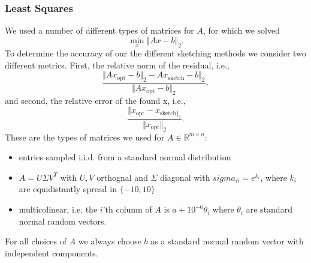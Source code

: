\documentclass{article}
\begin{document}
\subsubsection{Least Squares}
We used a number of different types of matrices for $A$, for which we solved 
$$
\min_x \Vert Ax - b \Vert_2.
$$
To determine the accuracy of our the different sketching methods we consider two different metrics. First, the relative norm of the residual, i.e.,
$$
\frac{\Vert Ax_{\mathrm{opt}} - b \Vert_2 - Ax_{\mathrm{sketch}} - b \Vert_2}{\Vert Ax_{\mathrm{opt}} - b \Vert_2},
$$
and second, the relative error of the found x, i.e.,
$$
\frac{\Vert x_{\mathrm{opt}} - x_{\mathrm{sketch}\Vert_2}} {\Vert x_{\mathrm{opt}} \Vert_2}.
$$
These are the types of matrices we used for $A \in \mathbb{R}^{m \times n}$: 
\begin{itemize}
    \item entries sampled i.i.d. from a standard normal distribution
    \item $A = U \Sigma V^T$ with $U, V$ orthognal and $\Sigma$ diagonal with $sigma_{ii} = e^{k_i}$, where $k_i$ are equidistantly spread in $\{-10, 10\}$
    \item multicolinear, i.e. the $i$'th column of $A$ is $a + 10^{-6}\theta_i$ where $\theta_i$ are standard normal random vectors. 
\end{itemize}
For all choices of $A$ we always choose $b$ as a standard normal random vector with independent components. 
\end{document}
